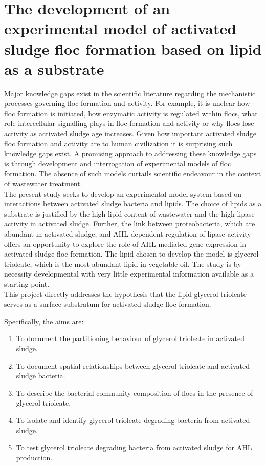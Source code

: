 \documentclass[11pt]{article}
\begin{document}
\section{The development of an experimental model of activated sludge floc formation based on lipid as a substrate}
Major knowledge gaps exist in the scientific literature regarding the mechanistic processes governing floc formation and activity. For example, it is unclear how floc formation is initiated, how enzymatic activity is regulated within flocs, what role intercellular signalling plays in floc formation and activity or why flocs lose activity as activated sludge age increases. Given how important activated sludge floc formation and activity are to human civilization it is surprising such knowledge gaps exist. A promising approach to addressing these knowledge gaps is through development and interrogation of experimental models of floc formation. The absence of such models curtails scientific endeavour in the context of wastewater treatment.  \\

The present study seeks to develop an experimental model system based on interactions between activated sludge bacteria and lipids. The choice of lipids as a substrate is justified by the high lipid content of wastewater and the high lipase activity in activated sludge. Further, the link between proteobacteria, which are abundant in activated sludge, and AHL dependent regulation of lipase activity offers an opportunity to explore the role of AHL mediated gene expression in activated sludge floc formation. The lipid chosen to develop the model is glycerol trioleate, which is the most abundant lipid in vegetable oil. The study is by necessity developmental with very little experimental information available as a starting point.\\

This project directly addresses the hypothesis that the lipid glycerol trioleate serves as a surface substratum for activated sludge floc formation. 


Specifically, the aims are:
\begin{enumerate}
\item To document the partitioning behaviour of glycerol trioleate in activated sludge.
\item To document spatial relationships between glycerol trioleate and activated sludge bacteria.
\item To describe the bacterial community composition of flocs in the presence of glycerol trioleate.
\item To isolate and identify glycerol trioleate degrading bacteria from activated sludge.
\item To test glycerol trioleate degrading bacteria from activated sludge for AHL production.
\end{enumerate}
\newpage
\end{document}
